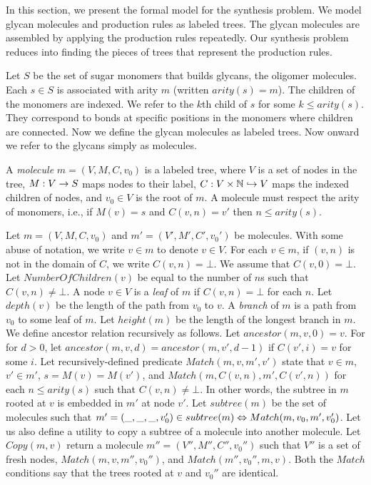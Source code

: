
In this section, we present the formal model for the synthesis problem.
We model glycan molecules and production rules as labeled trees. The glycan molecules are assembled by applying the production rules repeatedly.
Our synthesis problem reduces into finding the pieces of trees that represent the production rules.

Let $S$ be the set of sugar monomers that builds glycans,
the oligomer molecules. Each $s \in S$ is associated with arity $m$ 
(written $arity(s) = m$).
The children of the monomers are indexed. We refer to the $k$th child of $s$ for some $k \leq arity(s)$.
They correspond to bonds at specific positions in the monomers where children are connected.
Now we define the glycan molecules as labeled trees. Now onward we refer to the glycans simply as molecules.

\begin{df}
A {\em molecule} $m = (V,M,C,v_0)$ is a labeled tree, where 
$V$ is a set of nodes in the tree,
$M : V \rightarrow S$ maps nodes to their label, 
$C : V \times \mathbb{N} \hookrightarrow V$ maps the indexed children of nodes, and
$v_0 \in V$ is the root of $m$.
A molecule must respect the arity of monomers, i.e., if $M(v) = s$ and $C(v,n) = v'$ then $n \leq arity(s)$.
\end{df}
Let $\mathit{m = (V,M,C,v_0)}$ and $m' = (V',M',C',v_0')$ be molecules.
With some abuse of notation, we write $v \in m$ to denote $v \in V$.
For each $v \in m$, if $(v,n)$ is not in the domain of $C$, we write $C(v,n) = \bot$.
We assume that $C(v,0) = \bot$.
Let $NumberOfChildren(v)$ be equal to the number of $n$s such that $C(v,n) \neq \bot$. 
A node $v \in V$ is a {\em leaf} of $m$ if $C(v,n) = \bot$ for each $n$.
Let $depth(v)$ be the length of the path from $v_0$ to $v$.
A {\em branch} of $m$ is a path from $v_0$ to some leaf of $m$.
Let $height(m)$ be the length of the longest branch in $m$.
We define ancestor relation recursively as follows. Let $ancestor(m,v,0) = v$.
For for $d > 0$, let $ancestor(m,v,d) = ancestor(m,v', d-1)$ if $C(v',i) = v$ for some $i$.
Let recursively-defined predicate $Match(m,v,m',v')$ state that 
$v \in m$, $v' \in m'$, $s = M(v) = M(v')$, and $Match( m, C(v,n), m', C(v',n) )$ for each $n \leq arity(s)$ such that $C(v,n) \neq \bot$.
In other words, the subtree in $m$ rooted at $v$ is embedded in $m'$ at node $v'$.
Let $subtree(m)$ be the set of molecules such that
$m' = (\_,\_,\_,v_0') \in subtree(m) \Leftrightarrow Match(m,v_0,m',v_0')$.
Let us also define a utility to copy a subtree of a molecule into another molecule.
Let $Copy(m,v)$ return a molecule $m'' = (V'',M'',C'',v_0'')$ such that 
$V''$ is a set of fresh nodes, $Match(m,v,m'',v_0'')$, and $Match(m'',v_0'',m,v)$.
Both the $Match$ conditions say that the trees rooted at
$v$ and $v_0''$ are identical.

